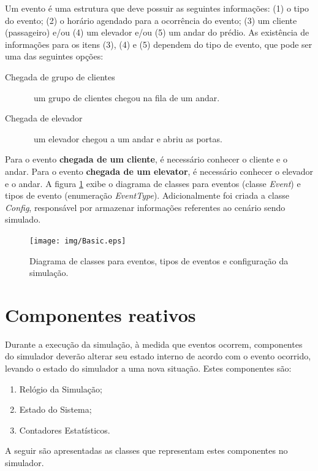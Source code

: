 Um evento é uma estrutura que deve possuir as seguintes informações: (1) o tipo
do evento; (2) o horário agendado para a ocorrência do evento; (3) um cliente
(passageiro) e/ou (4) um elevador e/ou (5) um andar do prédio. As existência de
informações para os itens (3), (4) e (5) dependem do tipo de evento, que pode
ser uma das seguintes opções:

\begin{description}
  \item[Chegada de grupo de clientes] \hfill \ um grupo de clientes chegou na fila de um andar.
  \item[Chegada de elevador] \hfill \ um elevador chegou a um andar e abriu as portas.
\end{description}

Para o evento \textbf{chegada de um cliente}, é necessário conhecer o cliente e
o andar. Para o evento \textbf{chegada de um elevator}, é necessário conhecer o
elevador e o andar. A figura \ref{fig:diagram:event} exibe o diagrama de classes
para eventos (classe \textit{Event}) e tipos de evento (enumeração
\textit{EventType}). Adicionalmente foi criada a classe \textit{Config},
responsável por armazenar informações referentes ao cenário sendo simulado.

\begin{figure}[htb!]
  \centering
  \texttt{[image: img/Basic.eps]}
  \caption[Diagrama de classes para eventos, tipos e configuração]{Diagrama de classes para eventos, tipos de eventos e configuração da simulação.}
\label{fig:diagram:event}
\end{figure}

\section{\label{sec:reactive}Componentes reativos}

Durante a execução da simulação, à medida que eventos ocorrem, componentes do
simulador deverão alterar seu estado interno de acordo com o evento ocorrido,
levando o estado do simulador a uma nova situação. Estes componentes são:

\begin{enumerate}
  \item Relógio da Simulação;
  \item Estado do Sistema;
  \item Contadores Estatísticos.
\end{enumerate}

A seguir são apresentadas as classes que representam estes componentes no
simulador.

